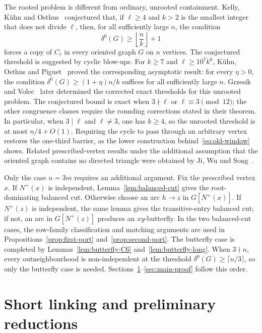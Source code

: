 \documentclass[11pt]{amsart}
\theoremstyle{definition}
\begin{document}
The rooted problem is different from ordinary, unrooted containment.
Kelly, K\"uhn and Osthus~\cite[Conjecture~5]{KKO} conjectured that, if
$\ell\ge4$ and $k>2$ is the smallest integer that does not divide
$\ell$, then, for all sufficiently large $n$, the condition
\[
  \delta^0(G)\ge \left\lfloor\frac nk\right\rfloor+1
\]
forces a copy of $C_\ell$ in every oriented graph $G$ on $n$ vertices.
The conjectured threshold is suggested by cyclic blow-ups.
For $k\ge7$ and $\ell\ge10^7k^6$, K\"uhn, Osthus and
Piguet~\cite{KOP} proved the corresponding asymptotic
result: for every $\eta>0$, the condition
$\delta^0(G)\ge(1+\eta)n/k$ suffices for all sufficiently large $n$.
Grzesik and Volec~\cite[Theorem~1.4]{GV} later determined the corrected
exact thresholds for this unrooted problem.  The conjectured bound is
exact when $3\nmid\ell$ or $\ell\equiv3\pmod{12}$; the other congruence
classes require the rounding corrections stated in their theorem.
In particular, when $3\mid\ell$ and $\ell\ne3$, one has $k\ge4$, so
the unrooted threshold is at most $n/4+O(1)$.
Requiring the cycle to pass through an arbitrary vertex restores the
one-third barrier, as the lower construction
behind~\eqref{eq:old-window} shows.  Related prescribed-vertex results
under the additional assumption that the oriented graph contains no
directed triangle were obtained by Ji, Wu and Song~\cite[Theorem~1.4]{JWS}.

Only the case $n=3m$ requires an additional argument.  Fix the
prescribed vertex $x$.  If $N^+(x)$ is independent,
Lemma~\ref{lem:balanced-cut} gives the root-dominating balanced cut.
Otherwise choose an arc $h\to z$ in $G[N^+(x)]$.  If $N^+(z)$ is
independent, the same lemma gives the transitive-entry balanced cut; if
not, an arc in $G[N^+(z)]$ produces an $xy$-butterfly.  In the two
balanced-cut cases, the row-family classification and matching
arguments are used in Propositions~\ref{prop:first-port}
and~\ref{prop:second-port}.  The butterfly case is completed by
Lemmas~\ref{lem:butterfly-C6} and~\ref{lem:butterfly-long}.  When
$3\nmid n$, every outneighbourhood is non-independent at the threshold
$\delta^0(G)\ge\lceil n/3\rceil$, so only the butterfly case is needed.
Sections~\ref{sec:prelim}--\ref{sec:main-proof} follow this order.

\section{Short linking and preliminary reductions}\label{sec:prelim}
\end{document}
